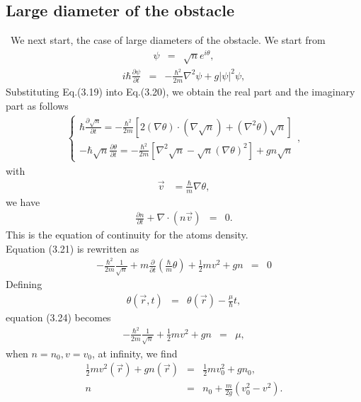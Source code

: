 \documentclass[12pt,a4paper]{report} %
\begin{document}
\subsection{Large diameter of the obstacle}
\ We next start, the case of large diameters of the obstacle.
We start from
\begin{eqnarray}
\psi & = & \sqrt{n} e^{i \theta},
\end{eqnarray}
\begin{eqnarray}
i \hbar \frac{\partial \psi}{\partial t} & = &
- \frac{\hbar^2}{2m} \nabla^2 \psi + g | \psi |^2 \psi,
\end{eqnarray}
Substituting Eq.(3.19) into Eq.(3.20), we obtain the real part and the imaginary part as follows
\begin{eqnarray}
\left \{
\begin{array}{l}
\hbar \frac{\partial \sqrt{n}}{\partial t}
= - \frac{\hbar^2}{2m} \left[
2 ( \nabla \theta ) \cdot (\nabla \sqrt{n}) + (\nabla^2 \theta)\sqrt{n}
\right]
\\
-\hbar \sqrt{n} \frac{\partial \theta}{\partial t}
= - \frac{\hbar^2}{2m} \left[
\nabla^2 \sqrt{n} - \sqrt{n} (\nabla \theta)^2
\right]
+ gn \sqrt{n}
\end{array}
\right . ,
\end{eqnarray}
with
\begin{eqnarray}
\vec{v} & = \frac{\hbar}{m} \nabla \theta,
\end{eqnarray}
we have
\begin{eqnarray}
\frac{\partial n}{\partial t} + \nabla \cdot (n \vec{v}) & = & 0.
\end{eqnarray}
This is the equation of continuity for the atoms density.
\\
Equation (3.21) is rewritten as
\begin{eqnarray}
-\frac{\hbar^2}{2m} \frac{1}{\sqrt{n}} + m \frac{\partial}{\partial t} \left( \frac{\hbar}{m} \theta \right)
+ \frac{1}{2} m v^2 + gn & = & 0
\end{eqnarray}
Defining
\begin{eqnarray}
\theta ( \vec{r}, t) & = & \theta( \vec{r} ) - \frac{\mu}{\hbar} t,
\end{eqnarray}
equation (3.24) becomes
\begin{eqnarray}
-\frac{\hbar^2}{2m} \frac{1}{\sqrt{n}} + \frac{1}{2} m v^2 + gn & = & \mu,
\end{eqnarray}
when $n = n_0, v=v_0$, at infinity, we find
\begin{eqnarray}
\frac{1}{2} m v^2(\vec{r}) + gn(\vec{r}) & = & \frac{1}{2} m v_0^2 + gn_0,
\\
n & = & n_0 + \frac{m}{2g} (v_0^2 - v^2 ).
\end{eqnarray}
\end{document}
